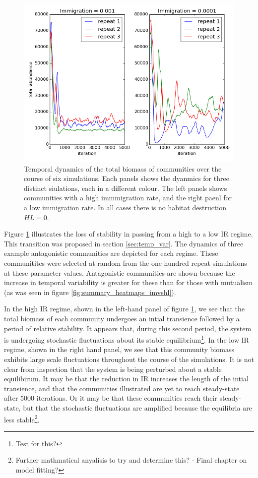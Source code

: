 \begin{itemize}
\begin{figure}[h!]
	\centering	
	\includegraphics[width=0.8\linewidth]{"./chapters/chapter04/figures/total_biomass_dynamics_hl_0_mai_0"}
	\caption{Temporal dynamics of the total biomass of communities over the course of six simulations. Each panels shows the dyanmics for three distinct siulations, each in a different colour. The left panels shows communities with a high immmigration rate, and the right paenl for a low immigration rate. In all cases there is no habitat destruction $HL=0$.}
	\label{fig:total_biomass_dynamics}
\end{figure}


Figure \ref{fig:total_biomass_dynamics} illustrates the loss of stability in passing from a high to a low IR regime. This transition was proposed in section \ref{sec:temp_var}. The dynamics of three example antagonistic communities are depicted for each regime. These communitites were selected at random from the one hundred repeat simulations at these parameter values. Antagonistic communities are shown because the increase in temporal variability is greater for these than for those with mutualism (as was seen in figure \ref{fig:summary_heatmaps_imvshl}). 

In the high IR regime, shown in the left-hand panel of figure \ref{fig:total_biomass_dynamics}, we see that the total biomass of each community undergoes an intial transience followed by a period of relative stability. It appears that, during this second period, the system is undergoing stochastic fluctuations about its stable equilibrium\footnote{Test for this?}. In the low IR regime, shown in the right hand panel, we see that this community biomass exhibits large scale fluctuations throughout the course of the simulations. It is not clear from inspection that the system is being perturbed about a stable equilibirum. It may be that the reduction in IR increases the length of the intial transience, and that the communities illustrated are yet to reach steady-state after 5000 iterations. Or it may be that these communities reach their steady-state, but that the stochastic fluctuations are amplified because the equilibria are less stable\footnote{Further mathmatical anyalisis to try and determine this? - Final chapter on model fitting?}. 


\end{itemize}
